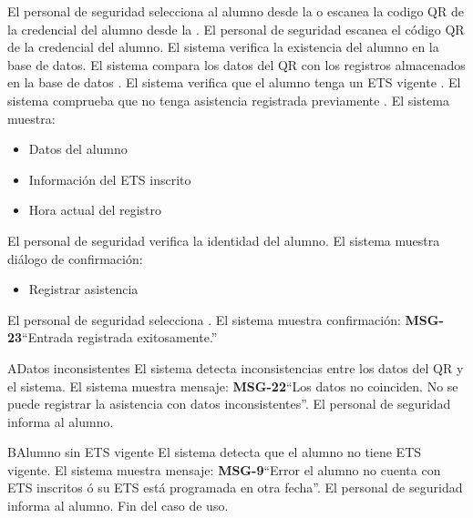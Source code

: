\begin{UCtrayectoria}
	\UCpaso[\UCactor] El personal de seguridad selecciona al alumno desde la  o escanea la codigo QR de la credencial del alumno desde la .
	\UCpaso[\UCactor] El personal de seguridad escanea el código QR de la credencial del alumno.
	\UCpaso El sistema verifica la existencia del alumno en la base de datos.
	\UCpaso El sistema compara los datos del QR con los registros almacenados en la base de datos .
	\UCpaso El sistema verifica que el alumno tenga un ETS vigente .
	\UCpaso El sistema comprueba que no tenga asistencia registrada previamente .
	\UCpaso El sistema muestra:
	\begin{itemize}
		\item Datos del alumno 
		\item Información del ETS inscrito
		\item Hora actual del registro
	\end{itemize}
	\UCpaso[\UCactor] El personal de seguridad verifica la identidad del alumno.
	\UCpaso El sistema muestra diálogo de confirmación:
	\begin{itemize}
		\item Registrar asistencia 
	\end{itemize}
	\UCpaso[\UCactor] El personal de seguridad selecciona .
	\UCpaso El sistema muestra confirmación: {\bf MSG-23}{``Entrada registrada exitosamente.''}
\end{UCtrayectoria}
\begin{UCtrayectoriaA}{A}{Datos inconsistentes}
	\UCpaso El sistema detecta inconsistencias entre los datos del QR y el sistema.
	\UCpaso El sistema muestra mensaje: {\bf MSG-22}{``Los datos no coinciden. No se puede registrar la asistencia con datos inconsistentes''}.
	\UCpaso[\UCactor] El personal de seguridad informa al alumno.
\end{UCtrayectoriaA}
\begin{UCtrayectoriaA}{B}{Alumno sin ETS vigente}
	\UCpaso El sistema detecta que el alumno no tiene ETS vigente.
	\UCpaso El sistema muestra mensaje: {\bf MSG-9}{``Error el alumno no cuenta con ETS inscritos ó su ETS está programada en otra fecha''}.
	\UCpaso[\UCactor] El personal de seguridad informa al alumno.
	\UCpaso Fin del caso de uso.
\end{UCtrayectoriaA}

